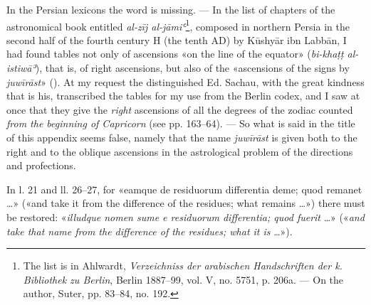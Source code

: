\documentclass[11pt]{article}
\newcommand{\Pg}[1]{\marginpar{\footnotesize\color{gray}#1}}
\begin{document}
\par \Pg{I 326}In the Persian lexicons the word is missing. — In the list of chapters of the astronomical book entitled \emph{al-zīj al-jāmiʿ}\footnote{The list is in Ahlwardt, \emph{Verzeichniss der arabischen Handschriften der k. Bibliothek zu Berlin}, Berlin 1887–99, vol. V, no. 5751, p. 206a. — On the author, Suter, pp. 83–84, no. 192.}, composed in northern Persia in the second half of the fourth century H (the tenth AD) by Kūshyār ibn Labbān, I had found tables not only of ascensions «on the line of the equator» (\emph{bi-khaṭṭ al-istiwāʾ}), that is, of right ascensions, but also of the «ascensions of the signs by \emph{juwīrāst}» (). At my request the distinguished Ed. Sachau, with the great kindness that is his, transcribed the tables for my use from the Berlin codex, and I saw at once that they give the \emph{right} ascensions of all the degrees of the zodiac counted \emph{from the beginning of Capricorn} (see pp. 163–64). — So what is said in the title of this appendix seems false, namely that the name \emph{juwīrāst} is given both to the right and to the oblique ascensions in the astrological problem of the directions and profections.\par
\par In l. 21 and ll. 26–27, for «eamque de residuorum differentia deme; quod remanet …» («and take it from the difference of the residues; what remains …») there must be restored: «\emph{illudque nomen sume e residuorum differentia; quod fuerit} …» («\emph{and take that name from the difference of the residues; what it is} …»).\par
\end{document}
